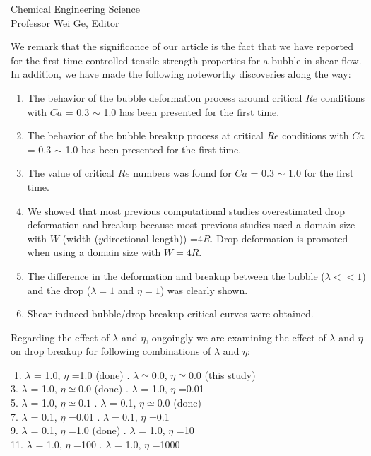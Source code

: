 \documentclass{letter}
\begin{document}
\begin{letter}{
Chemical Engineering Science\\
Professor Wei Ge, Editor\\}
\begin{enumerate}
We remark that the significance of our article is the fact that we have 
reported for the first time controlled tensile strength properties for a bubble in shear flow.  In addition, we have made the following noteworthy discoveries along the way:
\begin{enumerate}
\item The behavior of the bubble deformation process around critical $Re$ conditions with $Ca$ = 0.3  $\sim$ 1.0 has been presented for the first time.
\item The behavior of the bubble breakup process at critical $Re$ conditions with $Ca$ = 0.3  $\sim$ 1.0 has been presented for the first time.
\item The value of critical $Re$ numbers was found for $Ca$ = 0.3  $\sim$ 1.0 for the first time.
\item  We showed that most previous computational studies overestimated drop deformation and breakup because most previous studies used a domain size with $W$ (width ($y$directional length)) =4$R$. Drop deformation is promoted when using a domain size with $W=4R$. 
\item The difference in the deformation and breakup between the bubble ($\lambda<<1$) and the drop ($\lambda = 1$ and $\eta = 1$) was clearly shown.
\item Shear-induced bubble/drop breakup critical curves were obtained. 
\end{enumerate}

Regarding the effect of $\lambda$ and $\eta$, ongoingly we are examining the effect of $\lambda$ and $\eta$ on drop breakup for following 
combinations of $\lambda$ and $\eta$:

\begin{tabbing}
 \hspace{55mm} \= \hspace{10mm} \kill
 \hspace{5mm} 1. $\lambda$ = 1.0, $\eta$ =1.0 (done) . $\lambda \simeq 0.0$, $\eta \simeq 0.0$ (this study) \\ 
 \hspace{5mm} 3. $\lambda$ = 1.0, $\eta \simeq 0.0$ (done) . $\lambda$ = 1.0, $\eta$ =0.01 \\
 \hspace{5mm} 5. $\lambda$ = 1.0, $\eta \simeq 0.1$ . $\lambda$ = 0.1, $\eta \simeq 0.0$ (done) \\
 \hspace{5mm} 7. $\lambda$ = 0.1, $\eta$ =0.01 . $\lambda = 0.1$, $\eta$ =0.1  \\
 \hspace{5mm} 9. $\lambda$ = 0.1, $\eta$ =1.0 (done) . $\lambda$ = 1.0, $\eta$ =10  \\
 \hspace{5mm} 11. $\lambda$ = 1.0, $\eta$ =100 . $\lambda$ = 1.0, $\eta$ =1000 \\
\end{tabbing}


\end{enumerate}
\end{letter}
\end{document}

